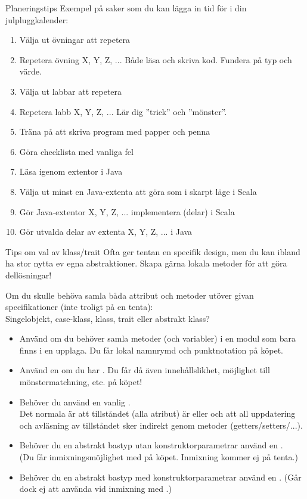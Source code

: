 \begin{Slide}{Planeringstips}\SlideFontTiny
Exempel på saker som du kan lägga in tid för i din julpluggkalender:
\begin{enumerate}
\item Välja ut övningar att repetera
\item Repetera övning X, Y, Z, ... Både läsa och skriva kod. Fundera på typ och värde.
\item Välja ut labbar att repetera
\item Repetera labb X, Y, Z, ... Lär dig ''trick'' och ''mönster''.
\item Träna på att skriva program med papper och penna
\item Göra checklista med vanliga fel
\item Läsa igenom extentor i Java
\item Välja ut minst en Java-extenta att göra som i skarpt läge i Scala
\item Gör Java-extentor X, Y, Z, ... implementera (delar) i Scala
\item Gör utvalda delar av extenta X, Y, Z, ... i Java
\end{enumerate}
\end{Slide}



\begin{Slide}{Tips om val av klass/trait}\SlideFontSmall
Ofta ger tentan en specifik design, men du kan ibland ha stor nytta ev egna abstraktioner. Skapa gärna lokala metoder för att göra dellösningar!

\vspace{1em}Om du skulle behöva samla båda attribut och metoder utöver givan specifikationer (inte troligt på en tenta):\\
Singelobjekt, case-klass, klass, trait eller abstrakt klass?
\begin{itemize}\SlideFontTiny
\item Använd  om du behöver samla metoder (och variabler) i en modul som bara finns i en upplaga. Du får lokal namnrymd och punktnotation på köpet.
\item Använd en  om du har . Du får då även innehållslikhet, möjlighet till mönstermatchning, etc. på köpet! 
\item Behöver du  använd en vanlig .\\ Det normala är att tillståndet (alla atribut) är  eller  och att all uppdatering och avläsning av tillståndet sker indirekt genom metoder (getters/setters/...). 
\item Behöver du en abstrakt bastyp utan konstruktorparametrar använd en . \\(Du får inmixningsmöjlighet med  på köpet. Inmixning kommer ej på tenta.)
\item Behöver du en abstrakt bastyp med konstruktorparametrar använd en . (Går dock ej att använda vid inmixning med .)
\end{itemize}
\end{Slide}


